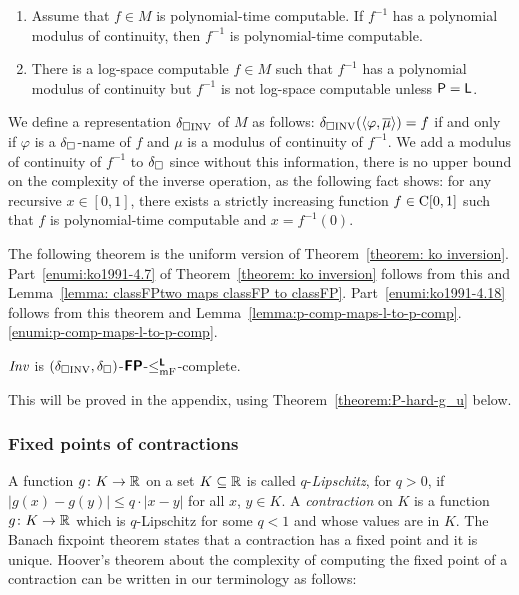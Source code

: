 \documentclass[a4paper,UKenglish]{lipics}
\begin{document}
\begin{theorem}
\label{theorem: ko inversion}
\begin{enumerate}
\item \label{enumi:ko1991-4.7}
Assume that $f \in M$ is polynomial-time computable. 
If $f^{-1}$ has a polynomial modulus of continuity, 
then $f^{-1}$ is polynomial-time computable.
\item \label{enumi:ko1991-4.18}
There is a log-space computable $f \in M$
such that $f^{-1}$ has a polynomial modulus of continuity
but $f^{-1}$ is not log-space computable
unless $\mathsf{P} = \mathsf{L}$.
\end{enumerate}
\end{theorem}

We define a representation $\delta _{\square \mathrm{INV}}$ of $M$ as follows:
$\delta _{\square \mathrm{INV}}(\langle \varphi, \overline{\mu} \rangle) = f$ 
if and only if $\varphi$ is a $\delta _\square$-name of $f$ 
and $\mu$ is a modulus of continuity of $f^{-1}$.
We add a modulus of continuity of $f^{-1}$ to $\delta _\square$
since without this information, there is no upper bound on 
the complexity of the inverse operation, 
as the following fact \cite[Theorem 4.4]{ko1991complexity} shows: 
for any recursive $x \in [0, 1]$, 
there exists a strictly increasing function $f \in \mathrm C[0, 1]$ 
such that $f$ is polynomial-time computable and $x = f^{-1}(0)$.

The following theorem is the uniform version of Theorem~\ref{theorem: ko inversion}. 
Part~\ref{enumi:ko1991-4.7} of Theorem~\ref{theorem: ko inversion} 
follows from this and Lemma~\ref{lemma: classFPtwo maps classFP to classFP}.
Part~\ref{enumi:ko1991-4.18} follows from this theorem and Lemma~\ref{lemma:p-comp-maps-l-to-p-comp}.\ref{enumi:p-comp-maps-l-to-p-comp}.

\begin{theorem}
 \label{theorem:INV-is-P-complete}
 $\mathit{Inv}$ is $(\delta _{\square \mathrm{INV}}, \delta _\square)$-$\text{\bfseries \sffamily \upshape FP}$-$\leq _{\mathrm{mF}} ^{\text{\bfseries \sffamily \upshape L}}$-complete.
\end{theorem}

This will be proved in the appendix, 
using 
Theorem~\ref{theorem:P-hard-g_u} below. 

\subsubsection{Fixed points of contractions}

A function $g \colon K \to \mathbb R$ on a set $K \subseteq \mathbb R$
is called $q$-\emph{Lipschitz}, for $q > 0$, 
if $
\lvert g (x) - g (y) \rvert \leq q \cdot \lvert x - y \rvert
$ for all $x$, $y \in K$. 
A \emph{contraction} on $K$ is 
a function $g \colon K \to \mathbb R$ which is $q$-Lipschitz for some $q < 1$
and whose values are in $K$. 
The Banach fixpoint theorem states that 
a contraction has a fixed point and it is unique. 
Hoover's theorem about the complexity of computing the fixed point
of a contraction can be written in our terminology as follows:
\end{document}

